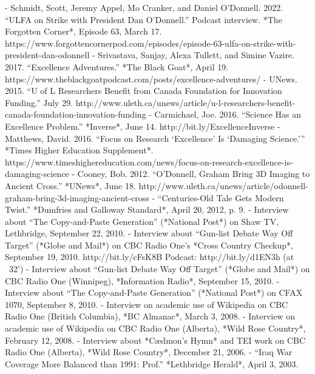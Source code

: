 - Schmidt, Scott, Jeremy Appel, Mo Cranker, and Daniel O’Donnell. 2022. “ULFA on Strike with President Dan O’Donnell.” Podcast interview. *The Forgotten Corner*, Episode 63, March 17. https:/\allowbreak{}/\allowbreak{}www.forgottencornerpod.com/\allowbreak{}episodes/\allowbreak{}episode-63-ulfa-on-strike-with-president-dan-odonnell
- Srivastava, Sanjay, Alexa Tullett, and Simine Vazire. 2017. “Excellence Adventures.” *The Black Goat*, April 19. https:/\allowbreak{}/\allowbreak{}www.theblackgoatpodcast.com/\allowbreak{}posts/\allowbreak{}excellence-adventures/\allowbreak{}
- UNews. 2015. “U of L Researchers Benefit from Canada Foundation for Innovation Funding.” July 29. http:/\allowbreak{}/\allowbreak{}www.uleth.ca/\allowbreak{}unews/\allowbreak{}article/\allowbreak{}u-l-researchers-benefit-canada-foundation-innovation-funding
- Carmichael, Joe. 2016. “Science Has an Excellence Problem.” *Inverse*, June 14. http:/\allowbreak{}/\allowbreak{}bit.ly/\allowbreak{}ExcellenceInverse
- Matthews, David. 2016. “Focus on Research ‘Excellence’ Is ‘Damaging Science.’” *Times Higher Education Supplement*. https:/\allowbreak{}/\allowbreak{}www.timeshighereducation.com/\allowbreak{}news/\allowbreak{}focus-on-research-excellence-is-damaging-science
- Cooney, Bob. 2012. “O’Donnell, Graham Bring 3D Imaging to Ancient Cross.” *UNews*, June 18. http:/\allowbreak{}/\allowbreak{}www.uleth.ca/\allowbreak{}unews/\allowbreak{}article/\allowbreak{}odonnell-graham-bring-3d-imaging-ancient-cross
- “Centuries-Old Tale Gets Modern Twist.” *Dumfries and Galloway Standard*, April 20, 2012, p. 9.
- Interview about “The Copy-and-Paste Generation” (*National Post*) on Shaw TV, Lethbridge, September 22, 2010.
- Interview about “Gun-list Debate Way Off Target” (*Globe and Mail*) on CBC Radio One’s *Cross Country Checkup*, September 19, 2010. http:/\allowbreak{}/\allowbreak{}bit.ly/\allowbreak{}cFsK8B Podcast: http:/\allowbreak{}/\allowbreak{}bit.ly/\allowbreak{}d1EN3h (at ~32')
- Interview about “Gun-list Debate Way Off Target” (*Globe and Mail*) on CBC Radio One (Winnipeg), *Information Radio*, September 15, 2010.
- Interview about “The Copy-and-Paste Generation” (*National Post*) on CFAX 1070, September 8, 2010.
- Interview on academic use of Wikipedia on CBC Radio One (British Columbia), *BC Almanac*, March 3, 2008.
- Interview on academic use of Wikipedia on CBC Radio One (Alberta), *Wild Rose Country*, February 12, 2008.
- Interview about *Cædmon’s Hymn* and TEI work on CBC Radio One (Alberta), *Wild Rose Country*, December 21, 2006.
- “Iraq War Coverage More Balanced than 1991: Prof.” *Lethbridge Herald*, April 3, 2003.

